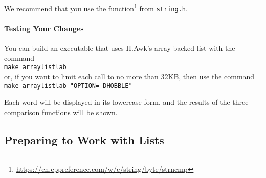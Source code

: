 We recommend that you use the  function\footnote{\url{https://en.cppreference.com/w/c/string/byte/strncmp}} from \texttt{string.h}.

\paragraph{Testing Your Changes}

You can build an executable that uses H.Awk's array-backed list with the command \\
\verb+make arraylistlab+ \\
or, if you want to limit each  call to no more than 32KB, then use the command \\
\verb+make arraylistlab "OPTION=-DHOBBLE"+

\begin{description}
\end{description}

Each word will be displayed in its lowercase form, and the results of the three comparison functions will be shown.

\begin{description}
\end{description}


\subsection{Preparing to Work with Lists}

